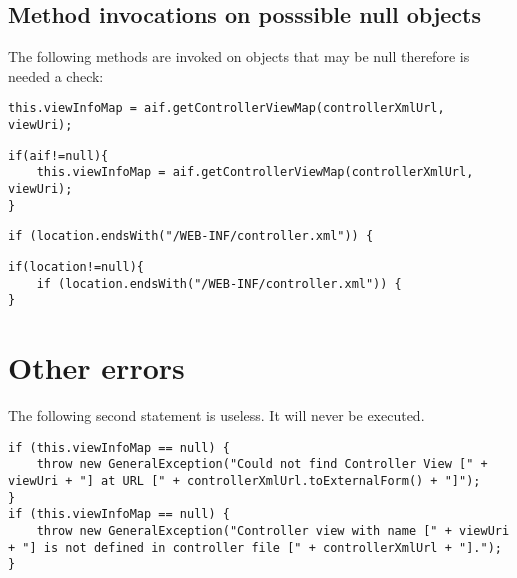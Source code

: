 \subsection{Method invocations on posssible null objects}
The following methods are invoked on objects that may be null therefore is needed a check:

\begin{lstlisting}[firstnumber=50, caption={getControllerViewMap invocation}]
this.viewInfoMap = aif.getControllerViewMap(controllerXmlUrl, viewUri);
\end{lstlisting}
\begin{lstlisting}[firstnumber=50, caption={getControllerViewMap invocation possible solution}]
if(aif!=null){
    this.viewInfoMap = aif.getControllerViewMap(controllerXmlUrl, viewUri);
}
\end{lstlisting}
\noindent\makebox[\linewidth]{\rule{\linewidth}{0.4pt}}

\begin{lstlisting}[firstnumber=87, caption={getControllerViewMap invocation}]
if (location.endsWith("/WEB-INF/controller.xml")) {
\end{lstlisting}
\begin{lstlisting}[firstnumber=87, caption={getControllerViewMap invocation possible solution}]
if(location!=null){
    if (location.endsWith("/WEB-INF/controller.xml")) {
}
\end{lstlisting}
\noindent\makebox[\linewidth]{\rule{\linewidth}{0.4pt}}

\section{Other errors}
The following second  statement is useless. It will never be executed.
\begin{lstlisting}[firstnumber=52, caption={Exeption would block the second if}]
if (this.viewInfoMap == null) {
    throw new GeneralException("Could not find Controller View [" + viewUri + "] at URL [" + controllerXmlUrl.toExternalForm() + "]");
}
if (this.viewInfoMap == null) {
    throw new GeneralException("Controller view with name [" + viewUri + "] is not defined in controller file [" + controllerXmlUrl + "].");
}
\end{lstlisting}


